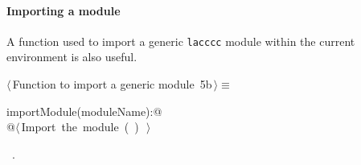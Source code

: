\documentclass[11pt,oneside]{article}	%
\begin{document}
\paragraph{Importing a module} A function used to import a generic \texttt{lacccc} module within the current environment is also useful.
\begin{flushleft} \small
\begin{minipage}{\linewidth} \label{scrap13}
\protect{}$\langle\,$Function to import a generic module\nobreak\ {\footnotesize 5b}$\,\rangle\equiv$
\vspace{-1ex}
\begin{list}{}{} \item
\mbox{}\verb@def importModule(moduleName):@\\
\mbox{}\verb@   @\hbox{$\langle\,$Import the module\nobreak\ ({\footnotesize {}\label{scrap14}
 }\mbox{}\verb@moduleName@ ) {\footnotesize {}}$\,\rangle$}\verb@@\\
\mbox{}\verb@@{\NWsep}
\end{list}
\vspace{-1ex}
\footnotesize\addtolength{\baselineskip}{-1ex}
\begin{list}{}{\setlength{\itemsep}{-\parsep}\setlength{\itemindent}{-\leftmargin}}
\item \NWtxtMacroRefIn\ .
\end{list}
\end{minipage}\\[4ex]
\end{flushleft}
\end{document}
